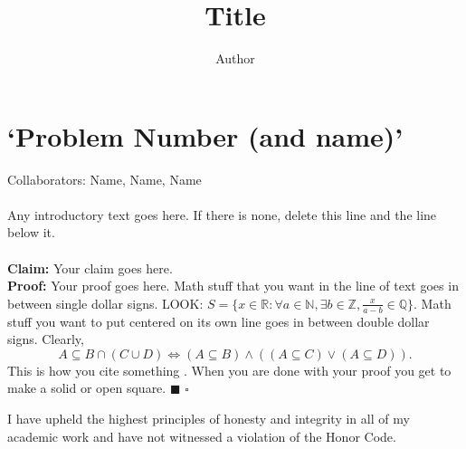 \documentclass[12PT]{article}
\title{Title}
\author{Author}
\newcommand{\N}{\mathbb{N}}
\newcommand{\Z}{\mathbb{Z}}
\newcommand{\R}{\mathbb{R}}
\newcommand{\Q}{\mathbb{Q}}
\newcommand{\bs}{\blacksquare}
\begin{document}
\maketitle




\section*{`Problem Number (and name)'}
Collaborators: Name, Name, Name\\
\\
Any introductory text goes here. If there is none, delete this line and the line below it.\\
\\
\textbf{Claim:} Your claim goes here.\\
\textbf{Proof:} Your proof goes here. Math stuff that you want in the line of text goes in between single dollar signs. LOOK: $S=\{x\in\R:\forall a\in \N, \exists b\in \Z, \frac{x}{a-b}\in\Q\}$. Math stuff you want to put centered on its own line goes in between double dollar signs. Clearly,
$$A\subseteq B\cap(C\cup D)\iff (A\subseteq B)\land ((A\subseteq C)\lor (A\subseteq D)).$$
This is how you cite something \cite{ReferenceLabel1}.
When you are done with your proof you get to make a solid or open square. $\bs$ $\square$




\newpage







\vfill
I have upheld the highest principles of honesty and integrity in all of my academic work and have not witnessed a violation of the Honor Code.

\end{document}
